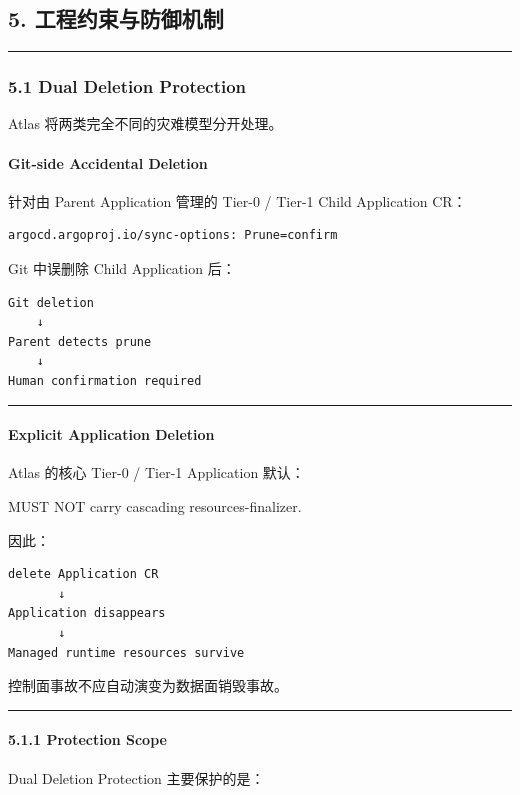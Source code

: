 \documentclass[11pt,a4paper]{article}
\begin{document}
\subsection{5. 工程约束与防御机制}
\vspace{0.5em}\hrule\vspace{0.5em}
\subsubsection{5.1 Dual Deletion Protection}
Atlas 将两类完全不同的灾难模型分开处理。

\paragraph{Git-side Accidental Deletion}
针对由 Parent Application 管理的 Tier-0 / Tier-1 Child Application CR：

\begin{lstlisting}[language=text]
argocd.argoproj.io/sync-options: Prune=confirm
\end{lstlisting}
Git 中误删除 Child Application 后：

\begin{lstlisting}[language=text]
Git deletion
    ↓
Parent detects prune
    ↓
Human confirmation required
\end{lstlisting}
\vspace{0.5em}\hrule\vspace{0.5em}
\paragraph{Explicit Application Deletion}
Atlas 的核心 Tier-0 / Tier-1 Application 默认：

\begin{gfmBlockquote}
MUST NOT carry cascading resources-finalizer.
\end{gfmBlockquote}
因此：

\begin{lstlisting}[language=text]
delete Application CR
       ↓
Application disappears
       ↓
Managed runtime resources survive
\end{lstlisting}
控制面事故不应自动演变为数据面销毁事故。

\vspace{0.5em}\hrule\vspace{0.5em}
\paragraph{5.1.1 Protection Scope}
Dual Deletion Protection 主要保护的是：
\end{document}
